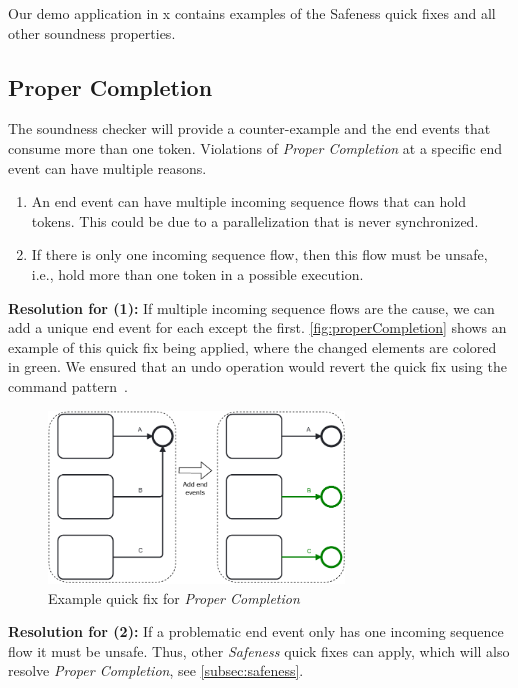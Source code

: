 \documentclass[runningheads]{llncs}
\begin{document}
Our demo application in x contains examples of the Safeness quick fixes and all other soundness properties.

\subsection{Proper Completion}
The soundness checker will provide a counter-example and the end events that consume more than one token.
Violations of \textit{Proper Completion} at a specific end event can have multiple reasons.

\begin{enumerate}
	\item An end event can have multiple incoming sequence flows that can hold tokens.
	This could be due to a parallelization that is never synchronized.
	\item If there is only one incoming sequence flow, then this flow must be unsafe, i.e., hold more than one token in a possible execution.
\end{enumerate}

\textbf{Resolution for (1):} If multiple incoming sequence flows are the cause, we can add a unique end event for each except the first.
\autoref{fig:properCompletion} shows an example of this quick fix being applied, where the changed elements are colored in green.
We ensured that an undo operation would revert the quick fix using the command pattern~\cite{gammaDesignPatternsElements1995}.

\begin{figure}[ht]
	\centering
	\includegraphics[width=0.7\textwidth]{images/properCompletion}
	\caption{Example quick fix for \textit{Proper Completion}}
	\label{fig:properCompletion}
\end{figure}

\textbf{Resolution for (2):} If a problematic end event only has one incoming sequence flow it must be unsafe.
Thus, other \textit{Safeness} quick fixes can apply, which will also resolve \textit{Proper Completion}, see \autoref{subsec:safeness}.
\end{document}
